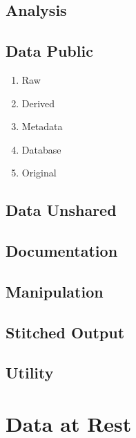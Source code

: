 \documentclass[
]{book}
\providecommand{\tightlist}{%
  \setlength{\itemsep}{0pt}\setlength{\parskip}{0pt}}
\begin{document}
\hypertarget{analysis}{%
\section{Analysis}\label{analysis}}

\hypertarget{data-public}{%
\section{Data Public}\label{data-public}}

\begin{enumerate}
\def\labelenumi{\arabic{enumi}.}
\tightlist
\item
  Raw
\item
  Derived
\item
  Metadata
\item
  Database
\item
  Original
\end{enumerate}

\hypertarget{data-unshared}{%
\section{Data Unshared}\label{data-unshared}}

\hypertarget{documentation}{%
\section{Documentation}\label{documentation}}

\hypertarget{manipulation}{%
\section{Manipulation}\label{manipulation}}

\hypertarget{stitched-output}{%
\section{Stitched Output}\label{stitched-output}}

\hypertarget{utility}{%
\section{Utility}\label{utility}}

\hypertarget{data-at-rest}{%
\chapter{Data at Rest}\label{data-at-rest}}
\end{document}
